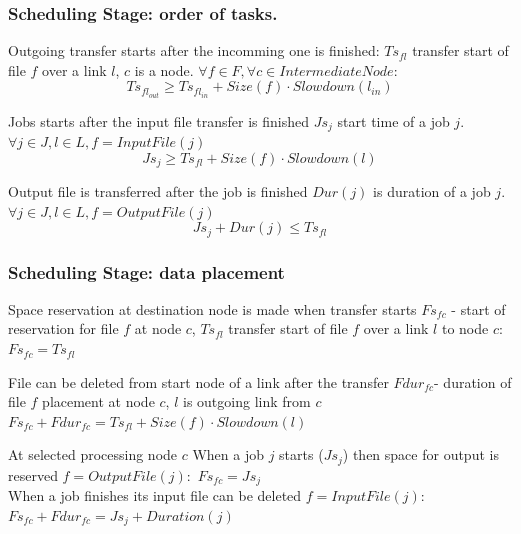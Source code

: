 \documentclass{beamer}
\begin{document}
		

\begin{frame}\frametitle{Scheduling Stage: order of tasks.}
\begin{block}{Outgoing transfer starts after the incomming one is finished:}
$Ts_{fl}$  transfer start of file $f$ over a link $l$, $c$ is a node. $\forall f \in F, \forall c \in IntermediateNode$:
$$Ts_{fl_{out}} \geq Ts_{fl_{in}} + Size(f) \cdot Slowdown(l_{in}) $$
\end{block}

\begin{block}{Jobs starts after the input file transfer is finished}
$Js_{j}$ start time of a job $j$. $\forall j \in J, l \in L, f = InputFile(j)$
$$Js_{j} \geq Ts_{fl} + Size(f)\cdot Slowdown(l)$$
\end{block}

\begin{block}{Output file is transferred after the job is finished}
$Dur(j)$ is duration of a job $j$.  $\forall j \in J, l \in L, f = OutputFile(j)$
$$Js_{j} +Dur(j) \leq Ts_{fl}$$
\end{block}
\end{frame}

\begin{frame}\frametitle{Scheduling Stage: data placement}
\begin{block}{Space reservation at destination node is made when transfer starts}
$Fs_{fc}$ - start of reservation for file $f$ at node $c$, $Ts_{fl}$  transfer start of file $f$ over a link $l$ to node $c$: \hspace{5mm} $Fs_{fc}=Ts_{fl}$ 

\end{block}
\begin{block}{File can be deleted from start node of a link after the transfer}
$Fdur_{fc}$- duration of file $f$ placement at node $c$, $l$ is outgoing link from $c$
\\ \hspace{30mm}$Fs_{fc}+Fdur_{fc}= Ts_{fl}+Size(f)\cdot Slowdown(l)$
\end{block}

\begin{block}{At selected processing node $c$}
When a job $j$ starts ($Js_j$) then space for output is reserved
$f = OutputFile(j):$ 
 \hspace{20mm}$Fs_{fc}=Js_{j} $
\\When a job finishes its input file can be deleted
$f = InputFile(j):$\\ \hspace{40mm} $Fs_{fc}+Fdur_{fc}=Js_j+Duration(j)  $
\end{block}
\end{frame}
\end{document}
